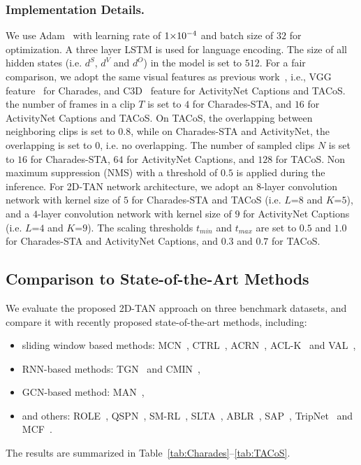 \documentclass[letterpaper]{article} %
\begin{document}
\subsubsection{Implementation Details.}
We use Adam~\cite{kingma2014adam} with learning rate of $1\small{\times}10^{-4}$
and batch size of $32$ for optimization.
A three layer LSTM is used for language encoding. The size of all hidden states (i.e. $d^S$, $d^V$ and $d^O$) in the model is set to $512$.
For a fair comparison, we adopt the same visual features as previous work~\cite{zhang2019man,zhang2019cross}, i.e., VGG feature~\cite{Simonyan15} for Charades, and C3D~\cite{tran2015learning} feature for ActivityNet Captions and TACoS.
the number of frames in a clip $T$ is set to $4$ for Charades-STA, and $16$ for ActivityNet Captions and TACoS.
On TACoS, the overlapping between neighboring clips is set to 0.8, while on Charades-STA and ActivityNet, the overlapping is set to 0, i.e. no overlapping.
The number of sampled clips $N$ is set to $16$ for Charades-STA, $64$ for ActivityNet Captions, and $128$ for TACoS.
Non maximum suppression (NMS) with a threshold of $0.5$ is applied during the inference.
For 2D-TAN network architecture, we adopt an $8$-layer convolution network with kernel size of $5$ for Charades-STA and TACoS (i.e. $L$=$8$ and $K$=$5$), and a $4$-layer convolution network with kernel size of $9$ for ActivityNet Captions (i.e. $L$=$4$ and $K$=$9$).
The scaling thresholds $t_{min}$ and $t_{max}$ are set to $0.5$ and $1.0$ for Charades-STA and ActivityNet Captions, and $0.3$ and $0.7$ for TACoS.


\subsection{Comparison to State-of-the-Art Methods}
We evaluate the proposed 2D-TAN approach on three benchmark datasets, and compare it with recently proposed state-of-the-art methods, including:
\begin{itemize}[leftmargin=0.38cm]
\item{
sliding window based methods:
MCN~\cite{hendricks17iccv},  CTRL~\cite{gao2017tall},  ACRN~\cite{liu2018attentive},  ACL-K~\cite{Ge_2019_WACV} and  VAL~\cite{song2018val},}
\item{RNN-based methods:
TGN~\cite{chen2018temporally} and CMIN~\cite{zhang2019cross},}
\item{
GCN-based method:
MAN~\cite{zhang2019man}, }
\item{
and others:
ROLE~\cite{liu2018crossmodal},  QSPN~\cite{xu2019multilevel},  SM-RL~\cite{wang2019language},  SLTA~\cite{jiang2019cross},  ABLR~\cite{yuan2019to},  SAP~\cite{chen2019semantic}, TripNet~\cite{Hahn2019tripping} and MCF~\cite{wu2018multi}.}
\end{itemize}
The results are summarized in Table~\ref{tab:Charades}--\ref{tab:TACoS}.
\end{document}
